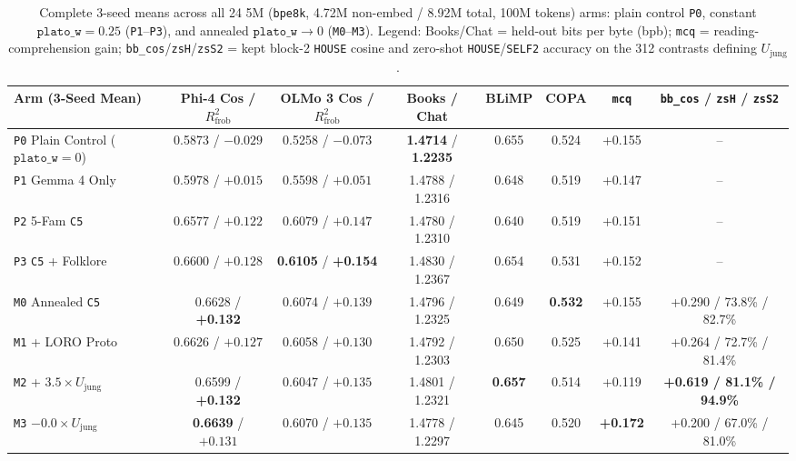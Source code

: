 \documentclass[conference]{IEEEtran}
\begin{document}
\begin{table}[t]
\centering
\caption{Complete 3-seed means across all 24 5M (\texttt{bpe8k}, 4.72M non-embed / 8.92M total, 100M tokens) arms: plain control \texttt{P0}, constant $\texttt{plato\_w}=0.25$ (\texttt{P1}--\texttt{P3}), and annealed $\texttt{plato\_w}\to0$ (\texttt{M0}--\texttt{M3}). Legend: Books/Chat = held-out bits per byte (bpb); \texttt{mcq} = reading-comprehension gain; \texttt{bb\_cos}/\texttt{zsH}/\texttt{zsS2} = kept block-2 \texttt{HOUSE} cosine and zero-shot \texttt{HOUSE}/\texttt{SELF2} accuracy on the 312 contrasts defining $U_{\text{jung}}$.}
\label{tab:5m}
\scriptsize
\setlength{\tabcolsep}{2.6pt}
\begin{tabular}{@{}lccccccc@{}}
\toprule
\textbf{Arm (3-Seed Mean)} & \textbf{Phi-4 Cos / $R^2_{\text{frob}}$} & \textbf{OLMo 3 Cos / $R^2_{\text{frob}}$} & \textbf{Books / Chat} & \textbf{BLiMP} & \textbf{COPA} & \textbf{\texttt{mcq}} & \textbf{\texttt{bb\_cos} / \texttt{zsH} / \texttt{zsS2}} \\
\midrule
\texttt{P0} Plain Control ($\texttt{plato\_w}=0$) & 0.5873 / $-0.029$ & 0.5258 / $-0.073$ & \textbf{1.4714} / \textbf{1.2235} & 0.655 & 0.524 & +0.155 & -- \\
\texttt{P1} Gemma 4 Only & 0.5978 / $+0.015$ & 0.5598 / $+0.051$ & 1.4788 / 1.2316 & 0.648 & 0.519 & +0.147 & -- \\
\texttt{P2} 5-Fam \texttt{C5} & 0.6577 / $+0.122$ & 0.6079 / $+0.147$ & 1.4780 / 1.2310 & 0.640 & 0.519 & +0.151 & -- \\
\texttt{P3} \texttt{C5} + Folklore & 0.6600 / $+0.128$ & \textbf{0.6105} / \textbf{+0.154} & 1.4830 / 1.2367 & 0.654 & 0.531 & +0.152 & -- \\
\midrule
\texttt{M0} Annealed \texttt{C5} & 0.6628 / \textbf{+0.132} & 0.6074 / $+0.139$ & 1.4796 / 1.2325 & 0.649 & \textbf{0.532} & +0.155 & +0.290 / 73.8\% / 82.7\% \\
\texttt{M1} + LORO Proto & 0.6626 / $+0.127$ & 0.6058 / $+0.130$ & 1.4792 / 1.2303 & 0.650 & 0.525 & +0.141 & +0.264 / 72.7\% / 81.4\% \\
\texttt{M2} + $3.5\times U_{\text{jung}}$ & 0.6599 / \textbf{+0.132} & 0.6047 / $+0.135$ & 1.4801 / 1.2321 & \textbf{0.657} & 0.514 & +0.119 & \textbf{+0.619 / 81.1\% / 94.9\%} \\
\texttt{M3} $- 0.0\times U_{\text{jung}}$ & \textbf{0.6639} / $+0.131$ & 0.6070 / $+0.135$ & 1.4778 / 1.2297 & 0.645 & 0.520 & \textbf{+0.172} & +0.200 / 67.0\% / 81.0\% \\
\bottomrule
\end{tabular}
\end{table}
\end{document}
